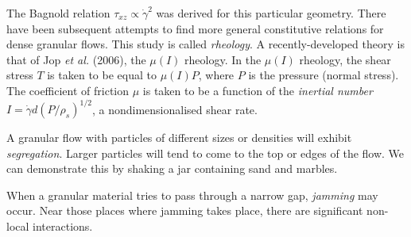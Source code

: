The Bagnold relation $\tau_{xz} \propto\dot\gamma^2$ was derived for this
particular geometry. There have been subsequent attempts to find more general
constitutive relations for dense granular flows. This study is called
\textit{rheology}. A recently-developed theory is that of Jop \textit{et al.}
(2006), the $\mu(I)$ rheology. In the $\mu(I)$ rheology, the shear stress $T$ is
taken to be equal to $\mu(I) P$, where $P$ is the pressure (normal stress). The
coefficient of friction $\mu$ is taken to be a function of the \textit{inertial
number} $I = \dot\gamma d (P / \rho_s)^{1/2}$, a nondimensionalised shear
rate.\cite{jop-2006}

A granular flow with particles of different sizes or densities will exhibit
\textit{segregation}. Larger particles will tend to come to the top or edges of
the flow. We can demonstrate this by shaking a jar containing sand and marbles. 

When a granular material tries to pass through a narrow gap, \textit{jamming}
may occur. Near those places where jamming takes place, there are significant
non-local interactions.

